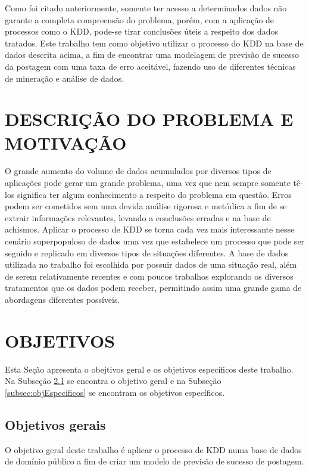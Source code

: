 Como foi citado anteriormente, somente ter acesso a determinados dados não garante a completa compreensão do problema, porém, com a aplicação de processos como o KDD, pode-se tirar conclusões úteis a respeito dos dados tratados. Este trabalho tem como objetivo utilizar o processo do KDD na base de dados descrita acima, a fim de encontrar uma modelagem de previsão de sucesso da postagem com uma taxa de erro aceitável, fazendo uso de diferentes técnicas de mineração e análise de dados.

\section{DESCRIÇÃO DO PROBLEMA E MOTIVAÇÃO}
\label{sec:descricaomotivacao}

O grande aumento do volume de dados acumulados por diversos tipos de aplicações pode gerar um grande problema, uma vez que nem sempre somente tê-los significa ter algum conhecimento a respeito do problema em questão. Erros podem ser cometidos sem uma devida análise rigorosa e metódica a fim de se extrair informações relevantes, levando a conclusões erradas e na base de achismos. Aplicar o processo de KDD se torna cada vez mais interessante nesse cenário superpopuloso de dados uma vez que estabelece um processo que pode ser seguido e replicado em diversos tipos de situações diferentes. A base de dados utilizada no trabalho foi escolhida por possuir dados de uma situação real, além de serem relativamente recentes e com poucos trabalhos explorando os diversos tratamentos que os dados podem receber, permitindo assim uma grande gama de abordagens diferentes possíveis.

\section{OBJETIVOS}
\label{sec:objetivos}
Esta Seção apresenta o obejtivos geral e os objetivos específicos deste trabalho. Na Subseção \ref{subsec:objGerais} se encontra o objetivo geral e na Subseção \ref{subsec:objEspecificos} se encontram os objetivos específicos.

\subsection{Objetivos gerais}
\label{subsec:objGerais}
O objetivo geral deste trabalho é aplicar o processo de KDD numa base de dados de domínio público a fim de criar um modelo de previsão de sucesso de postagem.

